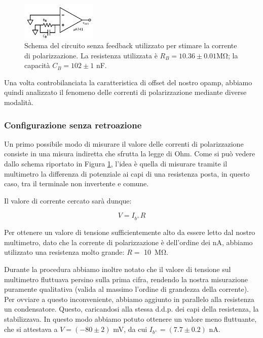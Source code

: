 \begin{figure}
  \begin{center}
    \includegraphics[width=0.320\textwidth]{../E02/latex/direct_measure.pdf}
  \end{center}
  \caption{Schema del circuito senza feedback utilizzato per stimare la corrente di polarizzazione. La resistenza utilizzata è $R_B=10.36\pm0.01$\si{\mega\ohm}; la capacità $C_B=102 \pm 1$ \si{\nano\farad}.}
  \label{cir2:correnti_senzaretroazione}
\end{figure}

Una volta controbilanciata la caratteristica di offset del nostro opamp, abbiamo quindi analizzato il fenomeno delle correnti di polarizzazione mediante diverse modalità.

\subsubsection{Configurazione senza retroazione}

Un primo possibile modo di misurare il valore delle correnti di polarizzazione consiste in una misura indiretta che sfrutta la legge di Ohm.
Come si può vedere dallo schema riportato in Figura \ref{cir2:correnti_senzaretroazione}, l'idea è quella di misurare tramite il multimetro la differenza di potenziale ai capi di una resistenza posta, in questo caso, tra il terminale non invertente e comune.

Il valore di corrente cercato sarà dunque:

$$V=I_{b^+} R$$

Per ottenere un valore di tensione sufficientemente alto da essere letto dal nostro multimetro, dato che la corrente di polarizzazione è dell'ordine dei \si{\nano\ampere}, abbiamo utilizzato una resistenza molto grande: $R =$ \SI{10}{\mega\ohm}.

Durante la procedura abbiamo inoltre notato che il valore di tensione sul multimetro fluttuava persino sulla prima cifra, rendendo la nostra misurazione puramente qualitativa (valida al massimo l'ordine di grandezza della corrente).
Per ovviare a questo inconveniente, abbiamo aggiunto in parallelo alla resistenza un condensatore. Questo, caricandosi alla stessa d.d.p. dei capi della resistenza, la stabilizzava.
In questo modo abbiamo potuto ottenere un valore meno fluttuante, che si attestava a $V=(-80 \pm 2)$ \si{\milli\volt}, da cui $I_{b^+}=(7.7 \pm 0.2)$ \si{\nano\ampere}.

